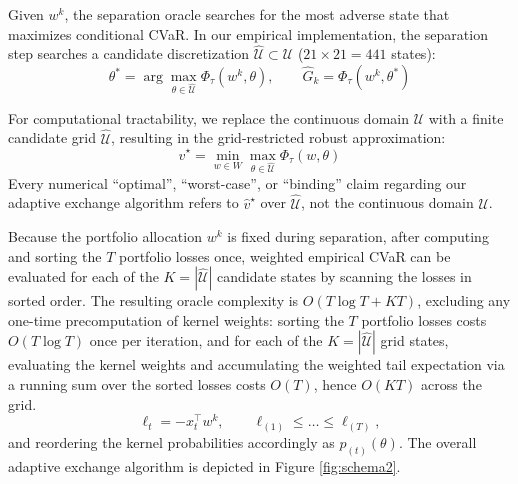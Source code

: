 \documentclass[smallextended]{svjour3}
\begin{document}
Given $w^k$, the separation oracle searches for the most adverse state that maximizes conditional CVaR. In our empirical implementation, the separation step searches a candidate discretization $\widehat{\mathcal{U}} \subset \mathcal{U}$ ($21\times21 = 441$ states):
\begin{equation}
    \theta^* = \arg\max_{\theta \in \widehat{\mathcal{U}}} \Phi_\tau(w^k, \theta), \qquad \widehat{G}_k = \Phi_\tau(w^k, \theta^*)
\end{equation}

For computational tractability, we replace the continuous domain $\mathcal{U}$ with a finite candidate grid $\widehat{\mathcal{U}}$, resulting in the grid-restricted robust approximation:
\begin{equation}
    \widehat{v}^\star = \min_{w \in W} \max_{\theta \in \widehat{\mathcal{U}}} \Phi_\tau(w, \theta)
\end{equation}
Every numerical ``optimal'', ``worst-case'', or ``binding'' claim regarding our adaptive exchange algorithm refers to $\widehat{v}^\star$ over $\widehat{\mathcal{U}}$, not the continuous domain $\mathcal{U}$.


Because the portfolio allocation $w^k$ is fixed during separation, after computing and sorting the $T$ portfolio losses once, weighted
empirical CVaR can be evaluated for each of the
$K=|\widehat{\mathcal U}|$ candidate states by scanning the losses in
sorted order. The resulting oracle complexity is
$O(T\log T+KT)$, excluding any one-time precomputation of kernel weights: sorting the $T$ portfolio losses costs $O(T\log T)$ once per iteration, and for each of the $K = |\widehat{\mathcal{U}}|$ grid states, evaluating the kernel weights and accumulating the weighted tail expectation via a running sum over the sorted losses costs $O(T)$, hence $O(KT)$ across the grid.
\begin{equation}
\ell_t = -x_t^\top w^k,\qquad \ell_{(1)} \le \dots \le \ell_{(T)},
\end{equation}
and reordering the kernel probabilities accordingly as $p_{(t)}(\theta)$.
The overall adaptive exchange algorithm is depicted in Figure \ref{fig:schema2}.
\end{document}
